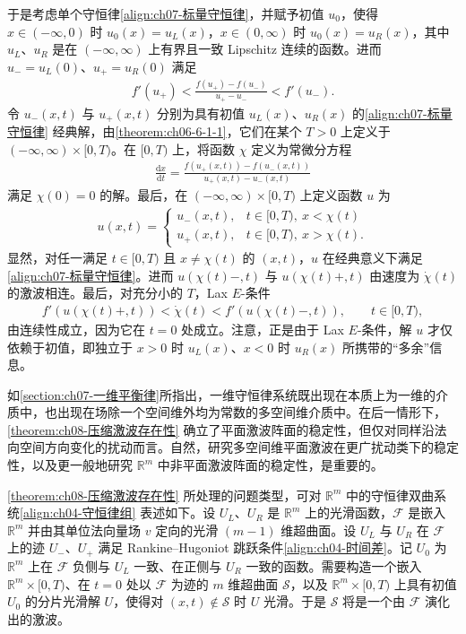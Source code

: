 \documentclass[../../main.tex]{subfiles}
\begin{document}
于是考虑单个守恒律\eqref{align:ch07-标量守恒律}，并赋予初值 $u_0$，使得 $x\in(-\infty,0)$ 时 $u_0(x)=u_L(x)$，$x\in(0,\infty)$ 时 $u_0(x)=u_R(x)$，其中 $u_L$、$u_R$ 是在 $(-\infty,\infty)$ 上有界且一致 Lipschitz 连续的函数。进而 $u_-=u_L(0)$、$u_+=u_R(0)$ 满足
\begin{align}
f'(u_+)<\frac{f(u_+)-f(u_-)}{u_+-u_-}<f'(u_-).
\label{align:ch08-标量严格lax}
\end{align}
令 $u_-(x,t)$ 与 $u_+(x,t)$ 分别为具有初值 $u_L(x)$、$u_R(x)$ 的\eqref{align:ch07-标量守恒律} 经典解，由\cref{theorem:ch06-6-1-1}，它们在某个 $T>0$ 上定义于 $(-\infty,\infty)\times[0,T)$。在 $[0,T)$ 上，将函数 $\chi$ 定义为常微分方程
\begin{align}
\frac{\mathrm{d}x}{\mathrm{d}t}=\frac{f(u_+(x,t))-f(u_-(x,t))}{u_+(x,t)-u_-(x,t)}
\label{align:ch08-激波运动方程}
\end{align}
满足 $\chi(0)=0$ 的解。最后，在 $(-\infty,\infty)\times[0,T)$ 上定义函数 $u$ 为
\begin{align}
u(x,t)=
\begin{cases}
u_-(x,t),&t\in[0,T),\ x<\chi(t)\\
u_+(x,t),&t\in[0,T),\ x>\chi(t).
\end{cases}
\label{align:ch08-标量解}
\end{align}
显然，对任一满足 $t\in[0,T)$ 且 $x\neq\chi(t)$ 的 $(x,t)$，$u$ 在经典意义下满足\eqref{align:ch07-标量守恒律}。进而 $u(\chi(t)-,t)$ 与 $u(\chi(t)+,t)$ 由速度为 $\dot\chi(t)$ 的激波相连。最后，对充分小的 $T$，Lax $E$-条件
\begin{align}
f'(u(\chi(t)+,t))<\dot\chi(t)<f'(u(\chi(t)-,t)),\qquad t\in[0,T),
\label{align:ch08-标量lax延续}
\end{align}
由连续性成立，因为它在 $t=0$ 处成立。注意，正是由于 Lax $E$-条件，解 $u$ 才仅依赖于初值，即独立于 $x>0$ 时 $u_L(x)$、$x<0$ 时 $u_R(x)$ 所携带的“多余”信息。

如\cref{section:ch07-一维平衡律}所指出，一维守恒律系统既出现在本质上为一维的介质中，也出现在场除一个空间维外均为常数的多空间维介质中。在后一情形下，\cref{theorem:ch08-压缩激波存在性} 确立了平面激波阵面的稳定性，但仅对同样沿法向空间方向变化的扰动而言。自然，研究多空间维平面激波在更广扰动类下的稳定性，以及更一般地研究 $\mathbb R^m$ 中非平面激波阵面的稳定性，是重要的。

\cref{theorem:ch08-压缩激波存在性} 所处理的问题类型，可对 $\mathbb R^m$ 中的守恒律双曲系统\eqref{align:ch04-守恒律组} 表述如下。设 $U_L$、$U_R$ 是 $\mathbb R^m$ 上的光滑函数，$\mathscr F$ 是嵌入 $\mathbb R^m$ 并由其单位法向量场 $v$ 定向的光滑 $(m-1)$ 维超曲面。设 $U_L$ 与 $U_R$ 在 $\mathscr F$ 上的迹 $U_-$、$U_+$ 满足 Rankine--Hugoniot 跳跃条件\eqref{align:ch04-时间差}。记 $U_0$ 为 $\mathbb R^m$ 上在 $\mathscr F$ 负侧与 $U_L$ 一致、在正侧与 $U_R$ 一致的函数。需要构造一个嵌入 $\mathbb R^m\times[0,T)$、在 $t=0$ 处以 $\mathscr F$ 为迹的 $m$ 维超曲面 $\mathscr S$，以及 $\mathbb R^m\times[0,T)$ 上具有初值 $U_0$ 的分片光滑解 $U$，使得对 $(x,t)\notin\mathscr S$ 时 $U$ 光滑。于是 $\mathscr S$ 将是一个由 $\mathscr F$ 演化出的激波。
\end{document}
